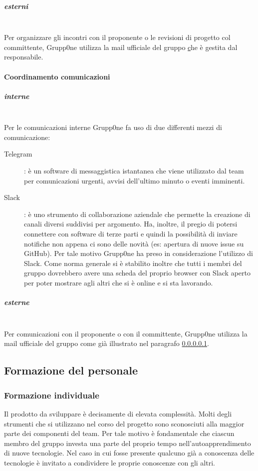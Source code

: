 \documentclass[../norme-di-progetto.tex]{subfiles}
\begin{document}
\subparagraph{esterni}%
\label{subp:coordinamento incontri/esterni}
\\Per organizzare gli incontri con il proponente o le revisioni di progetto col committente, Grupp0ne utilizza la mail ufficiale del gruppo \href{gruppone.swe@gmail.com} che è gestita dal responsabile.

\paragraph{Coordinamento comunicazioni}%
\label{par:coordinamento comunicazioni}

\subparagraph{interne}%
\label{subp:coordinamento comunicazioni/interne}
\\Per le comunicazioni interne Grupp0ne fa uso di due differenti mezzi di comunicazione:
\begin{description}
  \item [Telegram]: è un software di messaggistica istantanea che viene utilizzato dal team per comunicazioni urgenti, avvisi dell'ultimo minuto o eventi imminenti.
  \item [Slack]: è uno strumento di collaborazione aziendale che permette la creazione di canali diversi suddivisi per argomento. Ha, inoltre, il pregio di potersi connettere con software di terze parti e quindi la possibilità di inviare notifiche non appena ci sono delle novità (es: apertura di nuove issue su GitHub). Per tale motivo Grupp0ne ha preso in considerazione l'utilizzo di Slack. Come norma generale si è stabilito inoltre che tutti i membri del gruppo dovrebbero avere una scheda del proprio browser con Slack aperto per poter mostrare agli altri che si è online e si sta lavorando.
\end{description}

\subparagraph{esterne}%
\label{subp:esterne}
\\Per comunicazioni con il proponente o con il committente, Grupp0ne utilizza la mail ufficiale del gruppo come già illustrato nel paragrafo \ref{subp:coordinamento incontri/esterni}.

\subsection{Formazione del personale}%
\label{sub:formazione del personale}

\subsubsection{Formazione individuale}%
\label{subs:formazione individuale}

Il prodotto da sviluppare è decisamente di elevata complessità.
Molti degli strumenti che si utilizzano nel corso del progetto sono sconosciuti alla maggior parte dei componenti del team.
Per tale motivo è fondamentale che ciascun membro del gruppo investa una parte del proprio tempo nell'autoapprendimento di nuove tecnologie.
Nel caso in cui fosse presente qualcuno già a conoscenza delle tecnologie è invitato a condividere le proprie conoscenze con gli altri.
\end{document}
